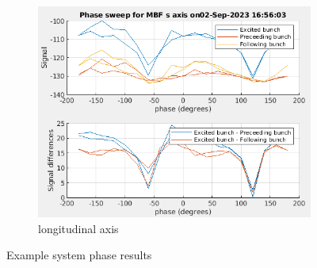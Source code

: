 \documentclass{report}
\begin{document}
\begin{figure}[hbt]
    \begin{subfigure}[b]{0.45\textwidth}
        \includegraphics[width=\textwidth]{vlr_system_phase_scan_s.png}
        \caption{longitudinal axis}
        \label{fig:system_phase_example_z}
    \end{subfigure}
    \caption{Example system phase results}
    \label{fig:system_phase_example}
\end{figure}
\end{document}
